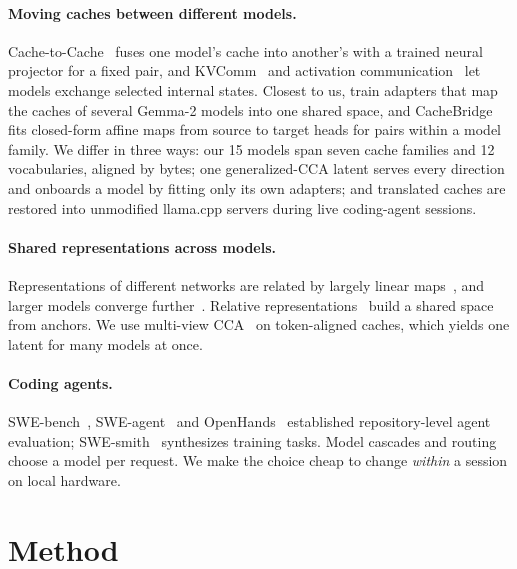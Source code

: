 \documentclass[11pt]{article}
\begin{document}
\paragraph{Moving caches between different models.} Cache-to-Cache~\citep{fu2025c2c} fuses one
model's cache into another's with a trained neural projector for a fixed pair, and
KVComm~\citep{shi2026kvcomm} and activation communication~\citep{ramesh2025activations} let models
exchange selected internal states. Closest to us, \citet{dery2026kvalign} train adapters that map
the caches of several Gemma-2 models into one shared space, and CacheBridge~\citep{qu2026cachebridge}
fits closed-form affine maps from source to target heads for pairs within a model family. We
differ in three ways: our 15 models span seven cache families and 12 vocabularies, aligned by bytes; one
generalized-CCA latent serves every direction and onboards a model by fitting only its own adapters; and
translated caches are restored into unmodified llama.cpp servers during live coding-agent sessions.

\paragraph{Shared representations across models.} Representations of different networks are
related by largely linear maps~\citep{lenc2015equivariance,bansal2021stitching,kornblith2019cka,raghu2017svcca},
and larger models converge further~\citep{huh2024platonic}. Relative
representations~\citep{moschella2023relative} build a shared space from anchors. We use
multi-view CCA~\citep{kettenring1971gcca} on token-aligned caches, which yields one latent for
many models at once.

\paragraph{Coding agents.} SWE-bench~\citep{jimenez2024swebench}, SWE-agent~\citep{yang2024sweagent}
and OpenHands~\citep{wang2025openhands} established repository-level agent evaluation;
SWE-smith~\citep{yang2025swesmith} synthesizes training tasks. Model cascades and
routing~\citep{chen2023frugalgpt,ong2024routellm} choose a model per request. We make the
choice cheap to change \emph{within} a session on local hardware.

\section{Method}\label{sec:method}
\end{document}
